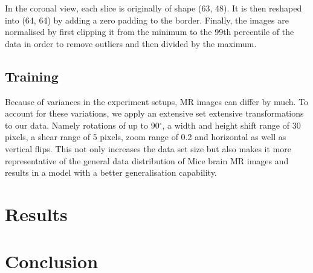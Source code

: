 \documentclass{article}
\begin{document}
In the coronal view, each slice is originally of shape (63, 48).
It is then reshaped into (64, 64) by adding a zero padding to the border.
Finally, the images are normalised by first clipping it from the minimum to the 99th percentile of the data in order to remove outliers and then divided by the maximum.

\subsection{Training}

Because of variances in the experiment setups, MR images can differ by much.
To account for these variations, we apply an extensive set extensive transformations to our data. Namely rotations of up to 90$^{\circ}$, a width and height shift range of 30 pixels, a shear range of 5 pixels, zoom range of 0.2 and horizontal as well as vertical flips.
This not only increases the data set size but also makes it more representative of the general data distribution of Mice brain MR images and results in a model with a better generalisation capability.

\section{Results}

\section{Conclusion}




\end{document}
